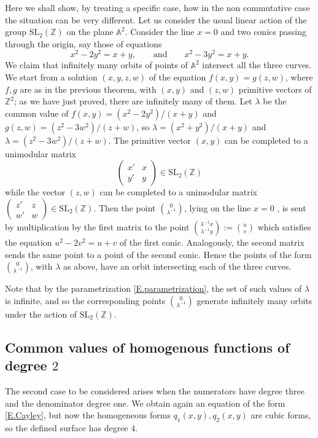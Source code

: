 \documentclass[leqno,12pt]{article} %
\def\A{{{\mathbb A}}}
\def\Z{{{\mathbb Z}}}
\theoremstyle{plain} %
\theoremstyle{definition} %
\begin{document}
Here we shall  show, by treating a specific case,  how  in the non commutative case the situation can be very different. Let us consider  the usual linear action of the group $\mathrm{SL}_2(\Z)$ on the plane $\A^2$. Consider the line $x=0$ and two conics passing through the origin, say those of equations
$$
x^2-2y^2=x+y,\qquad \mathrm{and}\qquad x^2-3y^2=x+y.
$$
 We claim that infinitely many orbits of points of $\A^2$ intersect all the three curves. We start from a solution $(x,y,z,w)$ of the equation $f(x,y)=g(z,w)$, where $f,g$ are as in the previous theorem, with $(x,y)$ and $(z,w)$ primitive vectors of $\Z^2$; as we have just proved, there are infinitely many of them.  
Let $\lambda$ be the common value of $f(x,y)=(x^2-2y^2)/(x+y)$ and $g(z,w)=(z^2-3w^2)/(z+w)$, so $\lambda=(x^2+y^2)/(x+y)$ and $\lambda=(z^2-3w^2)/(z+w)$. The primitive vector $(x,y)$ can be completed to a unimodular matrix 
$$\left(\begin{matrix}x'& x\\ y' & y\end{matrix}\right)\in\mathrm{SL}_2(\Z)$$
 while the vector $(z,w)$ can be completed to a unimodular matrix $\left(\begin{matrix}z'& z\\ w' & w\end{matrix}\right)\in\mathrm{SL}_2(\Z)$.
 Then the point ${0\choose \lambda^{-1}}$,  lying on the line $x=0$ , is sent by multiplication by the first matrix to the point ${\lambda^{-1}x \choose \lambda^{-1}y}:={u\choose v}$ which satisfies the equation $u^2-2v^2=u+v$ of the first conic. Analogously, the second matrix sends the same point to a point of the second conic. Hence the points of the form ${0\choose \lambda^{-1}}$, with $\lambda$ as above, have an orbit intersecting each of the three curves.
 
 Note that by the parametrization \eqref{E.parametrization}, the set of such values of $\lambda$ is infinite, and so the corresponding points ${0\choose \lambda^{-1}}$ generate infinitely many orbits under the action of $\mathrm{SL}_2(\Z)$. 

\medskip

\subsection{Common values of homogenous functions of degree $2$}
The second case to be considered arises when the numerators have degree three and the denominator degree one. We obtain again an equation of the form \eqref{E.Cayley}, but now the homogeneous forms $q_1(x,y), q_2(x,y)$ are cubic forms, so the defined surface has degree $4$. 
\end{document}
